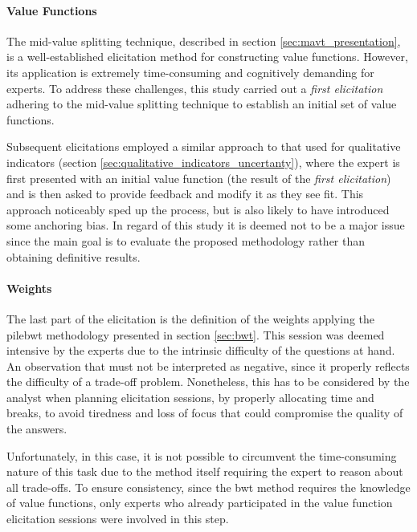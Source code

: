 \paragraph{Value Functions}
\label{sec:value_functions}
The mid-value splitting technique, described in section \ref{sec:mavt_presentation}, is a well-established elicitation method for constructing value functions. However, its application is extremely time-consuming and cognitively demanding for experts. To address these challenges, this study carried out a \textit{first elicitation} adhering to the mid-value splitting technique to establish an initial set of value functions.

Subsequent elicitations employed a similar approach to that used for qualitative indicators (section \ref{sec:qualitative_indicators_uncertanty}), where the expert is first presented with an initial value function (the result of the \textit{first elicitation}) and is then asked to provide feedback and modify it as they see fit. This approach noticeably sped up the process, but is also likely to have introduced some anchoring bias. In regard of this study it is deemed not to be a major issue since the main goal is to evaluate the proposed methodology rather than obtaining definitive results.

\paragraph{Weights}
The last part of the elicitation is the definition of the weights applying the \gls{pilebwt} methodology presented in section \ref{sec:bwt}. This session was deemed intensive by the experts due to the intrinsic difficulty of the questions at hand. An observation that must not be interpreted as negative, since it properly reflects the difficulty of a trade-off problem. Nonetheless, this has to be considered by the analyst when planning elicitation sessions, by properly allocating time and breaks, to avoid tiredness and loss of focus that could compromise the quality of the answers. 

Unfortunately, in this case, it is not possible to circumvent the time-consuming nature of this task due to the method itself requiring the expert to reason about all trade-offs. To ensure consistency, since the \gls{bwt} method requires the knowledge of value functions, only experts who already participated in the value function elicitation sessions were involved in this step. 


